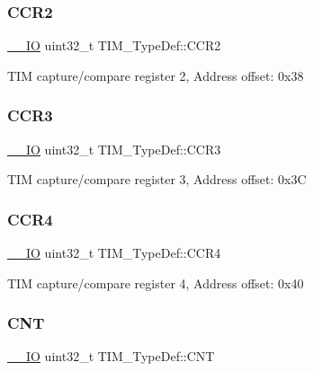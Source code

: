 \subsubsection{\texorpdfstring{C\+C\+R2}{CCR2}}
{\footnotesize\ttfamily \hyperlink{core__sc300_8h_aec43007d9998a0a0e01faede4133d6be}{\+\_\+\+\_\+\+IO} uint32\+\_\+t T\+I\+M\+\_\+\+Type\+Def\+::\+C\+C\+R2}

T\+IM capture/compare register 2, Address offset\+: 0x38 \mbox{\label{struct_t_i_m___type_def_ac83441bfb8d0287080dcbd945a272a74}} 
\subsubsection{\texorpdfstring{C\+C\+R3}{CCR3}}
{\footnotesize\ttfamily \hyperlink{core__sc300_8h_aec43007d9998a0a0e01faede4133d6be}{\+\_\+\+\_\+\+IO} uint32\+\_\+t T\+I\+M\+\_\+\+Type\+Def\+::\+C\+C\+R3}

T\+IM capture/compare register 3, Address offset\+: 0x3C \mbox{\label{struct_t_i_m___type_def_a5ba381c3f312fdf5e0b4119641b3b0aa}} 
\subsubsection{\texorpdfstring{C\+C\+R4}{CCR4}}
{\footnotesize\ttfamily \hyperlink{core__sc300_8h_aec43007d9998a0a0e01faede4133d6be}{\+\_\+\+\_\+\+IO} uint32\+\_\+t T\+I\+M\+\_\+\+Type\+Def\+::\+C\+C\+R4}

T\+IM capture/compare register 4, Address offset\+: 0x40 \mbox{\label{struct_t_i_m___type_def_a6fdd2a7fb88d28670b472aaac0d9d262}} 
\subsubsection{\texorpdfstring{C\+NT}{CNT}}
{\footnotesize\ttfamily \hyperlink{core__sc300_8h_aec43007d9998a0a0e01faede4133d6be}{\+\_\+\+\_\+\+IO} uint32\+\_\+t T\+I\+M\+\_\+\+Type\+Def\+::\+C\+NT}

